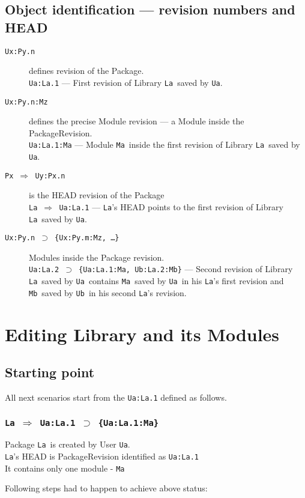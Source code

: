 \documentclass[10pt]{article}
\def\Ua{{\tt Ua}}
\def\Ub{{\tt Ub}}
\def\La{{\tt La}}
\def\Ma{{\tt Ma}}
\def\Mb{{\tt Mb}}
\def\headsto{${\Longrightarrow}$ }
\def\hto{\headsto}
\def\eq{${\supset}$ }
\begin{document}
	\subsection{Object identification --- revision numbers and HEAD}
	\begin{description}
		\item[{\tt Ux:Py.n}] defines revision of the Package.\\ 
			{\tt Ua:La.1} --- First revision of Library \La\ saved by \Ua.
		\item[{\tt Ux:Py.n:Mz}] defines the precise Module revision --- a Module inside the PackageRevision. \\ 
			{\tt Ua:La.1:Ma} --- Module \Ma\ inside the first revision of Library \La\ saved by \Ua.
		\item[{\tt Px \hto  Uy:Px.n}] is the HEAD revision of the Package\\ 
			{\tt La \hto  Ua:La.1} --- \La's HEAD points to the first revision of Library \La\ saved by \Ua.
		\item[{\tt Ux:Py.n \eq \{Ux:Py.m:Mz, \ldots\}}] Modules inside the Package revision.\\ 
			{\tt Ua:La.2 \eq \{Ua:La.1:Ma, Ub:La.2:Mb\}} --- Second revision of Library \La\ saved by \Ua\ contains \Ma\ saved by \Ua\ in his \La's first revision and \Mb\ saved by \Ub\ in his second \La's revision.
	\end{description}

\section{Editing Library and its Modules}

	\subsection{Starting point}
		\noindent All next scenarios start from the {\tt Ua:La.1} defined as follows.
		\subsubsection*{{\tt La \hto  Ua:La.1 \eq \{Ua:La.1:Ma\}}}
			Package \La\ is created by User \Ua.\\
			\La's HEAD is PackageRevision identified as {\tt Ua:La.1}\\
			It contains only one module - \Ma
			
			\noindent Following steps had to happen to achieve above status:
\end{document}
